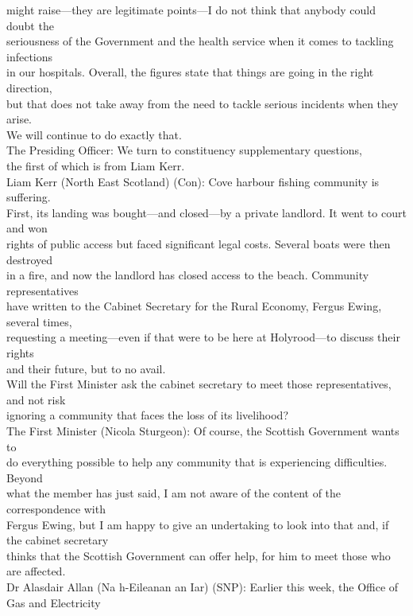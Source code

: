\documentclass{article}
\begin{document}
\begin{description}
{might raise—they are legitimate points—I do not think that anybody could doubt the\\
seriousness of the Government and the health service when it comes to tackling infections\\
in our hospitals. Overall, the figures state that things are going in the right direction,\\
but that does not take away from the need to tackle serious incidents when they arise.\\
We will continue to do exactly that.\\
The Presiding Officer: We turn to constituency supplementary questions,\\
the first of which is from Liam Kerr.\\
Liam Kerr (North East Scotland) (Con): Cove harbour fishing community is suffering.\\
First, its landing was bought—and closed—by a private landlord. It went to court and won\\
rights of public access but faced significant legal costs. Several boats were then destroyed\\
in a fire, and now the landlord has closed access to the beach. Community representatives\\
have written to the Cabinet Secretary for the Rural Economy, Fergus Ewing, several times,\\
requesting a meeting—even if that were to be here at Holyrood—to discuss their rights\\
and their future, but to no avail.\\
Will the First Minister ask the cabinet secretary to meet those representatives, and not risk\\
ignoring a community that faces the loss of its livelihood?\\
The First Minister (Nicola Sturgeon): Of course, the Scottish Government wants to\\
do everything possible to help any community that is experiencing difficulties. Beyond\\
what the member has just said, I am not aware of the content of the correspondence with\\
Fergus Ewing, but I am happy to give an undertaking to look into that and, if the cabinet secretary\\
thinks that the Scottish Government can offer help, for him to meet those who are affected.\\
Dr Alasdair Allan (Na h-Eileanan an Iar) (SNP): Earlier this week, the Office of Gas and Electricity\\
}
\end{description}
\end{document}

